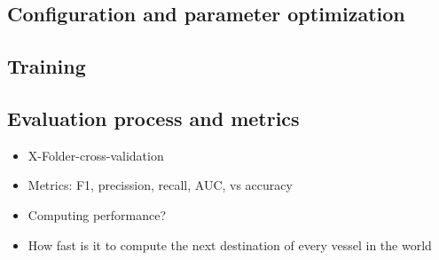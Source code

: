 \subsection{Configuration and parameter optimization}

\subsection{Training}

\subsection{Evaluation process and metrics}

\begin{itemize}
    \item X-Folder-cross-validation
    \item Metrics: F1, precission, recall, AUC, vs accuracy
    \item Computing performance?
    \item How fast is it to compute the next destination of every vessel in the world
\end{itemize}
